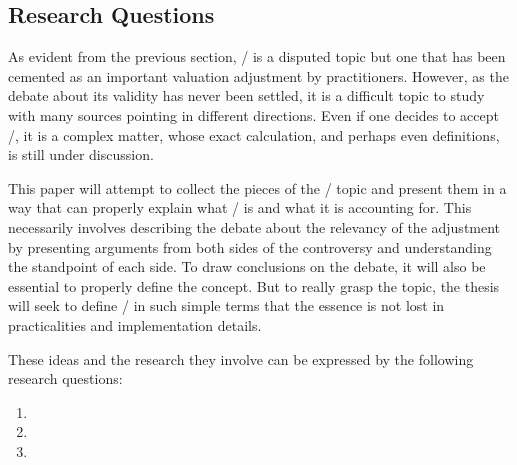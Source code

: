 \documentclass[main.tex]{subfiles}
\begin{document}
    \subsection{Research Questions}
        
    As evident from the previous section, \FVA/ is a disputed topic 
    but one that has been cemented as an important valuation adjustment by practitioners.
    However, as the debate about its validity has never been settled,
    it is a difficult topic to study with many sources pointing in different directions.
    Even if one decides to accept \FVA/, it is a complex matter,
    whose exact calculation, and perhaps even definitions, is still under discussion.

    This paper will attempt to collect the pieces of the \FVA/ topic
    and present them in a way that can properly explain what \FVA/ is and what it is accounting for.
    This necessarily involves describing the debate about the relevancy of the adjustment
    by presenting arguments from both sides of the controversy 
    and understanding the standpoint of each side.
    To draw conclusions on the debate, it will also be essential to properly define the concept.
    But to really grasp the topic, the thesis will seek to define \FVA/ in such simple terms 
    that the essence is not lost in practicalities and implementation details.

    These ideas and the research they involve can be expressed by the following research questions:
    \begin{enumerate}
        \item \researchQuestionFundingCosts
        \item \researchQuestionFvaDebate
        \item \researchQuestionFvaImplications
    \end{enumerate}
\end{document}
